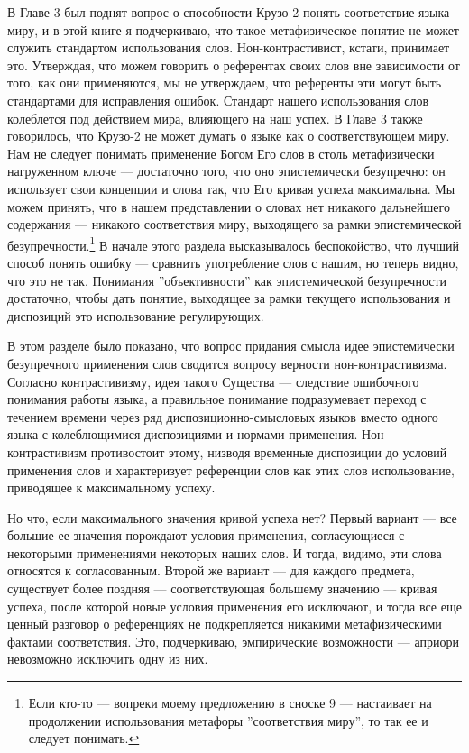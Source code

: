 \documentclass[11pt]{book}
\begin{document}
В Главе 3 был поднят вопрос о способности Крузо-2 понять соответствие языка миру, и в этой книге я подчеркиваю, что такое метафизическое понятие не может служить стандартом использования слов. Нон-контрастивист, кстати, принимает это. Утверждая, что можем говорить о референтах своих слов вне зависимости от того, как они применяются, мы не утверждаем, что референты эти могут быть стандартами для исправления ошибок. Стандарт нашего использования слов колеблется под действием мира, влияющего на наш успех. В Главе 3 также говорилось, что Крузо-2 не может думать о языке как о соответствующем миру. Нам не следует понимать применение Богом Его слов в столь метафизически нагруженном ключе --- достаточно того, что оно эпистемически безупречно: он использует свои концепции и слова так, что Его кривая успеха максимальна. Мы можем принять, что в нашем представлении о словах нет никакого дальнейшего содержания --- никакого соответствия миру, выходящего за рамки эпистемической безупречности.\footnote{Если кто-то --- вопреки моему предложению в сноске 9 --- настаивает на продолжении использования метафоры ''соответствия миру'', то так ее и следует понимать.} В начале этого раздела высказывалось беспокойство, что лучший способ понять ошибку --- сравнить употребление слов с нашим, но теперь видно, что это не так. Понимания ''объективности'' как эпистемической безупречности достаточно, чтобы дать понятие, выходящее за рамки текущего использования и диспозиций это использование регулирующих.

В этом разделе было показано, что вопрос придания смысла идее эпистемически безупречного применения слов сводится вопросу верности нон-контрастивизма. Согласно контрастивизму, идея такого Существа --- следствие ошибочного понимания работы языка, а правильное понимание подразумевает переход с течением времени через ряд диспозиционно-смысловых языков вместо одного языка с колеблющимися диспозициями и нормами применения. Нон-контрастивизм противостоит этому, низводя временные диспозиции до условий применения слов и характеризует референции слов как этих слов использование, приводящее к максимальному успеху.

Но что, если максимального значения кривой успеха нет? Первый вариант --- все большие ее значения порождают условия применения, согласующиеся с некоторыми применениями некоторых наших слов. И тогда, видимо, эти слова относятся к согласованным. Второй же вариант --- для каждого предмета, существует более поздняя --- соответствующая большему значению --- кривая успеха, после которой новые условия применения его исключают, и тогда все еще ценный разговор о референциях не подкрепляется никакими метафизическими фактами соответствия. Это, подчеркиваю, эмпирические возможности --- априори невозможно исключить одну из них.
\end{document}
